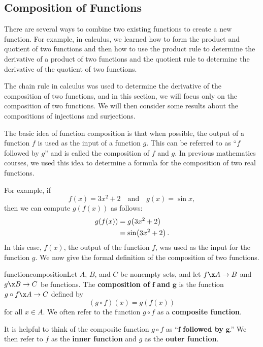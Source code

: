 
\subsection*{Composition of Functions}
There are several ways to combine two existing functions to create a new function.  For example, in calculus, we learned how to form the product and quotient of two functions and then how to use the product rule to determine the derivative of a product of two functions and the quotient rule to determine the derivative of the quotient of two functions.

The chain rule in calculus was used to determine the derivative of the composition of two functions, and in this section,  we will focus only on the composition of two functions.  We will then consider some results about the compositions of injections and surjections.

The basic idea of function composition is that when possible, the output of a function  $f$  is used as the input of a function  $g$.  This can be referred to as ``$f$  followed by  $g$'' and is called the composition of  $f$  and  $g$. In previous mathematics courses, we used this idea to determine a formula for the composition of two real functions.

For example, if
\[
f( x ) = 3x^2  + 2 \quad \text{and} \quad g( x ) = \sin x, 
\]
then we can compute  $g( f( x ) )$  as follows:
\[
\begin{aligned}
  \hfill g( {f( x )} ) &= g \! \left( {3x^2  + 2} \right) \\
                       &= \sin \! \left( {3x^2  + 2} \right). \\ 
\end{aligned} 
\]
In this case,  $f( x )$, the output of the function  $f$, was used as the input for the function  $g$.  We now give the formal definition of the composition of two functions.  
\begin{defbox}{functioncomposition}{Let  $A$, $B$, and  $C$  be nonempty sets, and let  
$f\x A \to B$  and  $g\x B \to C$  be functions.  The \textbf{composition of}
%
%
  $\boldsymbol{f}$ \textbf{and} $\boldsymbol{g}$  is the function  $g \circ f\x A \to C$  defined by
\label{sym:composition}
\[
( {g \circ f} )( x ) = g\left( {f( x )} \right)
\]
for all  $x \in A$.  We often refer to the function  $g \circ f$ as a \textbf{composite function}.
%
%
}
\end{defbox}
It is helpful to think of the composite function  $g \circ f$
 as  ``$\boldsymbol{f}$  \textbf{followed by}  $\boldsymbol{g}$.''  We then refer to  $f$  as the \textbf{inner function}
%
%
 and  $g$  as the \textbf{outer function}.
%
%


